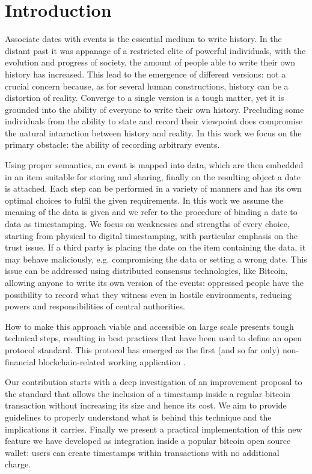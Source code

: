 \chapter{Introduction}
\label{chpr:intro}
Associate dates with events is the essential medium to write history. 
In the distant past it was appanage of a restricted elite of powerful individuals, with the evolution and progress of society, the amount of people able to write their own history has increased.
This lead to the emergence of different versions: not a crucial concern because, as for several human constructions, history can be a distortion of reality.
Converge to a single version is a tough matter, yet it is grounded into the ability of everyone to write their own history.
Precluding some individuals from the ability to state and record their viewpoint does compromise the natural intaraction between history and reality.
In this work we focus on the primary obstacle: the ability of recording arbitrary events.

Using proper semantics, an event is mapped into data, which are then embedded in an item suitable for storing and sharing, finally on the resulting object a date is attached. 
Each step can be performed in a variety of manners and has its own optimal choices to fulfil the given requirements. 
In this work we assume the meaning of the data is given and we refer to the procedure of binding a date to data as timestamping. 
We focus on weaknesses and strengths of every choice, starting from physical to digital timestamping, with particular emphasis on the trust issue.
If a third party is placing the date on the item containing the data, it may behave maliciously, e.g. compromising the data or setting a wrong date. This issue can be addressed using distributed consensus technologies, like Bitcoin, allowing anyone to write its own version of the events: oppressed people have the possibility to record what they witness even in hostile environments, reducing powers and responsibilities of central authorities.

How to make this approach viable and accessible on large scale presents tough technical steps, resulting in best practices \cite{OTSWeb} that have been used to define an open protocol standard. This protocol has emerged as the first (and so far only) non-financial blockchain-related working application \cite{ESMAresponse}.

Our contribution starts with a deep investigation of an improvement proposal \cite{PoePR, PoeIs} to the standard that allows the inclusion of a timestamp inside a regular bitcoin transaction without increasing its size and hence its cost. 
We aim to provide guidelines to properly understand what is behind this technique and the implications it carries.
Finally we present a practical implementation of this new feature we have developed as integration inside a popular bitcoin open source wallet: users can create timestamps within transactions with no additional charge. 

